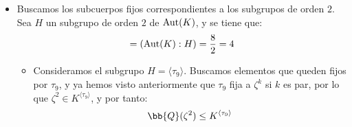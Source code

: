 \begin{ejemplo}
\begin{itemize}
\begin{itemize}
            El automorfismo $\tau_9$ fija a $\zeta^k$ si $k$ es par, y $\tau_7$ tan solo fija a $\zeta^8=-1\in \mathbb{Q}$. Por tanto, hemos de buscar otro valor que quede fijo por $\tau_7$ y $\tau_9$. Probamos con potencias de $\zeta$:
            \begin{align*}
                \tau_7(\zeta^2) &= \zeta^{14} \\
                \tau_7(\zeta^{14}) &= \zeta^{98} = \zeta^{2}
            \end{align*}

            Como $2,14$ son pares, $\tau_9$ fija a $\zeta^2$ y $\zeta^{14}$, por lo que $\tau_7$ y $\tau_9$ fijan a $\zeta^2+\zeta^{14}=\zeta^2-\zeta^6$. Por la conexión de Galois, tenemos que $\langle \tau_7, \tau_9\rangle\leq \Aut_{\bb{Q}(\zeta^2-\zeta^6)}(K)$. Viendo el diagrama de Hasse:
            \begin{equation*}
                \Aut_{\bb{Q}(\zeta^2-\zeta^6)} \in \{\langle \tau_7, \tau_9\rangle, \langle \tau_3, \tau_7\rangle\}
            \end{equation*}
            \begin{itemize}
                \item Como $\zeta^2-\zeta^6\notin \mathbb{Q}$ (pues $\{1,\zeta^2,\zeta^{6}\}$ es linealmente independiente sobre $\mathbb{Q}$), tenemos que $\Aut_{\bb{Q}(\zeta^2-\zeta^6)}(K)\neq \langle \tau_3, \tau_7\rangle$.
            \end{itemize}

            Por tanto, $\Aut_{\bb{Q}(\zeta^2-\zeta^6)}(K) = \langle \tau_7, \tau_9\rangle$, y por la conexión de Galois:
            \begin{equation*}
                K^{\langle \tau_7, \tau_9\rangle} = \bb{Q}(\zeta^2-\zeta^6)
            \end{equation*}
        \end{itemize}

        \item Buscamos los subcuerpos fijos correspondientes a los subgrupos de orden $2$. Sea $H$ un subgrupo de orden $2$ de $\operatorname{Aut}(K)$, y se tiene que:
        \begin{equation*}
            [K^H:\mathbb{Q}] = (\Aut(K):H) = \frac{8}{2} = 4
        \end{equation*}
        \begin{itemize}
            \item Consideramos el subgrupo $H = \langle \tau_9\rangle$. Buscamos elementos que queden fijos por $\tau_9$, y ya hemos visto anteriormente que $\tau_9$ fija a $\zeta^k$ si $k$ es par, por lo que $\zeta^2\in K^{\langle \tau_9\rangle}$, y por tanto:
            \begin{equation*}
                \bb{Q}(\zeta^2)\leq K^{\langle \tau_9\rangle}
            \end{equation*}


\end{itemize}
\end{itemize}
\end{ejemplo}

